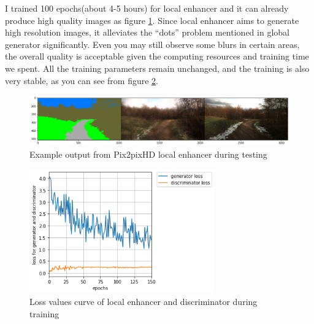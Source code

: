 I trained 100 epochs(about 4-5 hours) for local enhancer and it can already produce 
high quality images as figure \ref{fig:local-enhancer-output}. 
Since local enhancer aims to generate high resolution images, it alleviates the 
“dots” problem mentioned in global generator significantly.
Even you may still observe some blurs in certain areas, the overall quality is 
acceptable given the computing resources and training time we spent.
All the training parameters remain unchanged, and the training is also very stable, 
as you can see from figure \ref{fig:local-enhancer-loss}.
\begin{figure}[H]
    \begin{center}
    \includegraphics[width=14cm]{figures/local-enhancer-output}
    \end{center}
    \caption{Example output from Pix2pixHD local enhancer during testing}
    \label{fig:local-enhancer-output}
\end{figure}

\begin{figure}[H]
    \begin{center}
    \includegraphics[width=8cm]{figures/local-enhancer-loss}
    \end{center}
    \caption{Loss values curve of local enhancer and discriminator during training}
    \label{fig:local-enhancer-loss}
\end{figure}

